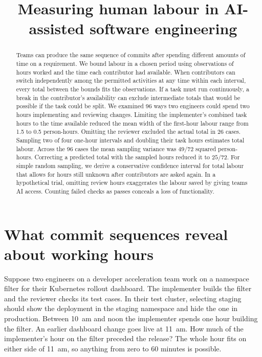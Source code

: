 \documentclass[12pt,a4paper]{amsart}
\title[Measuring human labour]{Measuring human labour in AI-assisted software engineering}
\date{}
\begin{document}
\begin{abstract}
Teams can produce the same sequence of commits after spending different amounts of time on a requirement. We bound labour in a chosen period using observations of hours worked and the time each contributor had available. When contributors can switch independently among the permitted activities at any time within each interval, every total between the bounds fits the observations. If a task must run continuously, a break in the contributor’s availability can exclude intermediate totals that would be possible if the task could be split. We examined 96 ways two engineers could spend two hours implementing and reviewing changes. Limiting the implementer's combined task hours to the time available reduced the mean width of the first-hour labour range from 1.5 to 0.5 person-hours. Omitting the reviewer excluded the actual total in 26 cases. Sampling two of four one-hour intervals and doubling their task hours estimates total labour. Across the 96 cases the mean sampling variance was $49/72$ squared person-hours. Correcting a predicted total with the sampled hours reduced it to $25/72$. For simple random sampling, we derive a conservative confidence interval for total labour that allows for hours still unknown after contributors are asked again. In a hypothetical trial, omitting review hours exaggerates the labour saved by giving teams AI access. Counting failed checks as passes conceals a loss of functionality.
\end{abstract}
\maketitle

\section{What commit sequences reveal about working hours}
\label{sec:intro}

Suppose two engineers on a developer acceleration team work on a namespace filter for their Kubernetes rollout dashboard. The implementer builds the filter and the reviewer checks its test cases. In their test cluster, selecting staging should show the deployment in the staging namespace and hide the one in production. Between 10~am and noon the implementer spends one hour building the filter. An earlier dashboard change goes live at 11~am. How much of the implementer's hour on the filter preceded the release? The whole hour fits on either side of 11~am, so anything from zero to 60 minutes is possible.
\end{document}
